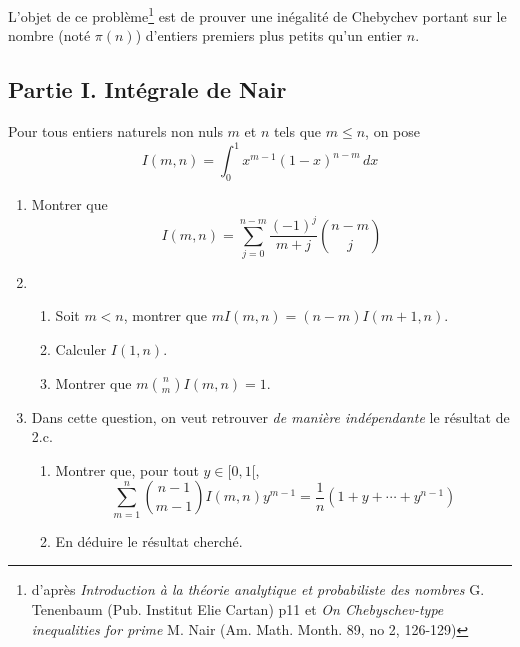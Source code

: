 L'objet de ce problème\footnote{d'après \emph{Introduction à la théorie analytique et probabiliste des nombres} G. Tenenbaum (Pub. Institut Elie Cartan) p11 et \emph{On Chebyschev-type inequalities for prime} M. Nair (Am. Math. Month. 89, no 2, 126-129)} est de prouver une inégalité de Chebychev portant sur le nombre (noté $\pi(n)$) d'entiers premiers plus petits qu'un entier $n$.
\subsection*{Partie I. Intégrale de Nair}
Pour tous entiers naturels non nuls $m$ et $n$ tels que $m\leq n$, on pose
\begin{displaymath}
 I(m,n) = \int_0^1 x^{m-1}(1-x)^{n-m}\,dx
\end{displaymath}
\begin{enumerate}
 \item Montrer que
\begin{displaymath}
 I(m,n) = \sum_{j=0}^{n-m}\frac{(-1)^j}{m+j}\binom{n-m}{j}
\end{displaymath}
\item 
\begin{enumerate}
 \item Soit $m<n$, montrer que $mI(m,n) = (n-m)I(m+1,n)$.
\item Calculer $I(1,n)$.
\item Montrer que $m\binom{n}{m}I(m,n) = 1$.
\end{enumerate}
\item Dans cette question, on veut retrouver \emph{de manière indépendante} le résultat de 2.c.
\begin{enumerate}
 \item Montrer que, pour tout $y\in [0,1[$,
\begin{displaymath}
 \sum_{m=1}^{n}\binom{n-1}{m-1}I(m,n)y^{m-1} = \frac{1}{n}\left(1+y+\cdots + y^{n-1} \right) 
\end{displaymath}
 \item En déduire le résultat cherché.
\end{enumerate}
\end{enumerate}

